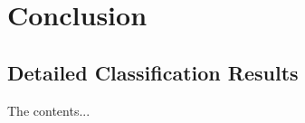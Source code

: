 \chapter{Conclusion}


\begin{appendices}
\chapter{Detailed Classification Results}
The contents...
\end{appendices}